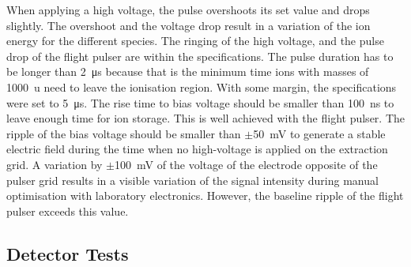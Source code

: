 	When applying a high voltage, the pulse overshoots its set value and drops slightly. The overshoot and the voltage drop result in a variation of the ion energy for the different species. The ringing of the high voltage, and the pulse drop of the flight pulser are within the specifications. The pulse duration has to be longer than 2~\si{\micro\second} because that is the minimum time ions with masses of 1000~u need to leave the ionisation region. With some margin, the specifications were set to 5~\si{\micro\second}. The rise time to bias voltage should be smaller than 100~ns to leave enough time for ion storage. This is well achieved with the flight pulser. The ripple of the bias voltage should be smaller than $\pm$50~mV to generate a stable electric field during the time when no high-voltage is applied on the extraction grid. A variation by $\pm$100~mV of the voltage of the electrode opposite of the pulser grid results in a visible variation of the signal intensity during manual optimisation with laboratory electronics. However, the baseline ripple of the flight pulser exceeds this value.


	\subsection{Detector Tests}\label{chapExp:Det}
	
